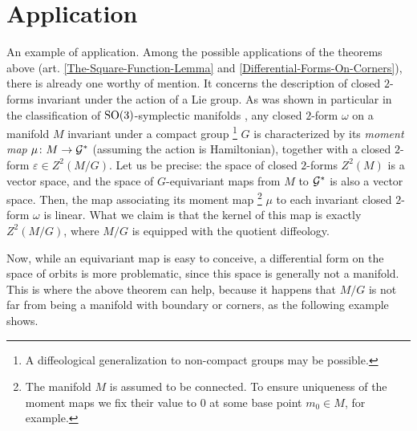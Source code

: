 \section{Application}

\begin{Article}{An example of application.}{}
  \label{An-Example-Of-Application}
  Among the possible applications of the theorems above (art. \ref{The-Square-Function-Lemma} and \ref{Differential-Forms-On-Corners}),
  there is already one worthy of mention.
  It concerns the description of closed $2$-forms
  invariant under the action of a Lie group.
  As was shown in particular in the classification of $\mathrm{SO}(3)$-symplectic manifolds \cite{Igl84,Igl91},
  any closed $2$-form $\omega$ on a manifold $M$
  invariant under a compact group%
  \footnote{A diffeological generalization to non-compact groups may be possible.}
  $G$
  is characterized by its \emph{moment map} $\mu \colon M \to \mathcal{G}^*$ (assuming the action is Hamiltonian),
  together with a closed $2$-form $\varepsilon \in Z^2(M/G)$.
  Let us be precise:
  the space of closed $2$-forms $Z^2(M)$ is a vector space,
  and the space of $G$-equivariant maps from $M$ to $\mathcal{G}^*$ is also a vector space.
  Then,
  the map associating its moment map%
  \footnote{The manifold $M$ is assumed to be connected.
  To ensure uniqueness of the moment maps we fix their value to $0$ at some base point $m_0 \in M$, for example.}
  $\mu$ to each invariant closed $2$-form $\omega$ is linear.
  What we claim is that the kernel of this map is exactly $Z^2(M/G)$,
  where $M/G$ is equipped with the quotient diffeology.
  
  Now,
  while an equivariant map is easy to conceive,
  a differential form on the space of orbits is more problematic,
  since this space is generally not a manifold.
  This is where the above theorem can help,
  because it happens that $M/G$ is not far from being a manifold with boundary or corners,
  as the following example shows.
  

\end{Article}
